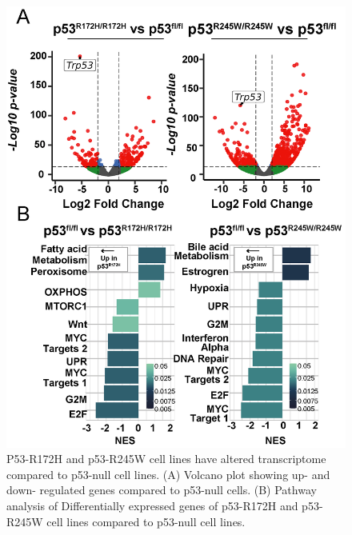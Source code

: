 \begin{figure}
\hypertarget{fig:3.11}{%
\centering
\includegraphics[width=1\textwidth,height=\textheight]{images/p539.png}
\caption{P53-R172H and p53-R245W cell lines have altered transcriptome compared to p53-null cell lines. (A) Volcano plot showing up- and down- regulated genes compared to p53-null cells. (B) Pathway analysis of Differentially expressed genes of p53-R172H and p53-R245W cell lines compared to p53-null cell lines.}\label{fig:3.11}
}
\end{figure}


